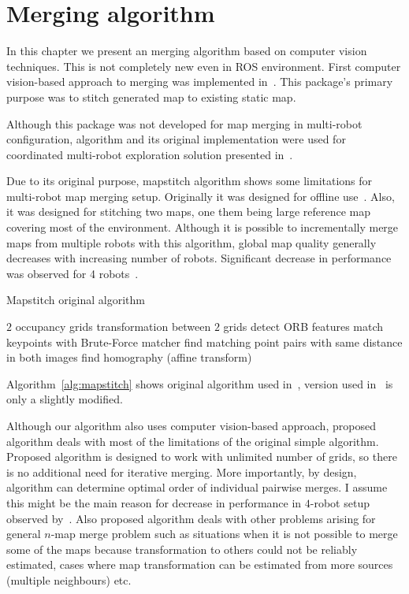 \chapter{Merging algorithm}
\label{chap:mergingalgorithm}

In this chapter we present an merging algorithm based on computer vision techniques. This is not completely new even in \gls{ROS} environment. First computer vision-based approach to merging was implemented in~\cite{MapstitchROS}. This package's primary purpose was to stitch generated map to existing static map.

Although this package was not developed for map merging in multi-robot configuration, algorithm and its original implementation were used for coordinated multi-robot exploration solution presented in~\cite{Andre2014}.

Due to its original purpose, mapstitch algorithm shows some limitations for multi-robot map merging setup. Originally it was designed for offline use~\cite{Andre2014}. Also, it was designed for stitching two maps, one them being large reference map covering most of the environment. Although it is possible to incrementally merge maps from multiple robots with this algorithm, global map quality generally decreases with increasing number of robots. Significant decrease in performance was observed for 4 robots~\cite{Andre2014}.

\begin{algorithm}
    \caption{Mapstitch original algorithm}
    \label{alg:mapstitch}
    \begin{algorithmic}[1]
        \Require $2$ occupancy grids
        \Ensure transformation between $2$ grids
            \State detect \gls{ORB} features
            \State match keypoints with Brute-Force matcher
            \State find matching point pairs with same distance in both images
            \State find homography (affine transform)
        \EndProcedure
    \end{algorithmic}
\end{algorithm}

Algorithm~\ref{alg:mapstitch} shows original algorithm used in~\cite{MapstitchROS}, version used in~\cite{Andre2014} is only a slightly modified.

Although our algorithm also uses computer vision-based approach, proposed algorithm deals with most of the limitations of the original simple algorithm. Proposed algorithm is designed to work with unlimited number of grids, so there is no additional need for iterative merging. More importantly, by design, algorithm can determine optimal order of individual pairwise merges. I assume this might be the main reason for decrease in performance in $4$-robot setup observed by~\cite{Andre2014}. Also proposed algorithm deals with other problems arising for general $n$-map merge problem such as situations when it is not possible to merge some of the maps because transformation to others could not be reliably estimated, cases where map transformation can be estimated from more sources (multiple neighbours) etc.


